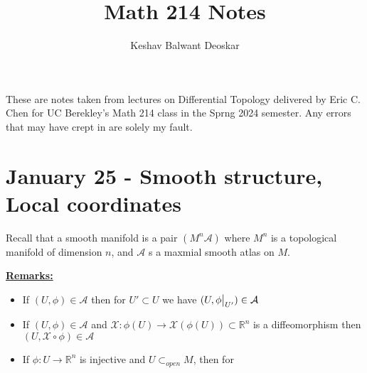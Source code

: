 \documentclass{article}
\title{Math 214 Notes}
\author{Keshav Balwant Deoskar}
\newcommand{\R}{\mathbb{R}}
\newcommand{\restr}[2]{{%
  \left.\kern-\nulldelimiterspace %
  #1 %
  \vphantom{\big|} %
  \right|_{#2} %
  }}
\begin{document}
\maketitle

These are notes taken from lectures on Differential Topology delivered by Eric C. Chen for UC Berekley's Math 214 class in the Sprng 2024 semester. Any errors that may have crept in are solely my fault.

\tableofcontents

\pagebreak

\section{January 25 - Smooth structure, Local coordinates}
\vskip 0.5cm

Recall that a smooth manifold is a pair $(M^n \mathcal{A})$ where $M^n$ is a topological manifold of dimension $n$, and $\mathcal{A}$ s a maxmial smooth atlas on $M$.

\vskip 0.5cm
\underline{\textbf{Remarks:}}
\begin{itemize}
  \item If $(U, \phi) \in \mathcal{A}$ then for $U' \subset U$ we have $(U, \restr{\phi}{U'})  \in \mathcal{A}$
  \item If $(U, \phi) \in \mathcal{A}$ and $\mathcal{X} : \phi(U) \rightarrow \mathcal{X}(\phi(U)) \subset \R^n$ is a diffeomorphism then $(U, \mathcal{X} \circ \phi) \in \mathcal{A}$
  \item If $\phi : U \rightarrow \R^n$ is injective and $U \subset_{open} M$, then for
\end{itemize}
\end{document}
